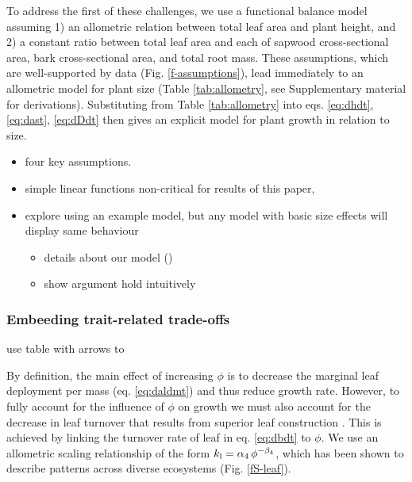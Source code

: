 \documentclass[12pt, a4paper]{article}
\begin{document}
To address the first of these challenges, we use a functional balance
model \citep{yokozawa-1995,falster-2011} assuming
1) an allometric relation between total leaf area and plant height, and
2) a constant ratio between total leaf area and each of sapwood
cross-sectional area, bark cross-sectional area, and total root mass.
These assumptions, which are well-supported by data (Fig.
\ref{f-assumptions}), lead immediately to an allometric model for plant
size (Table \ref{tab:allometry}, see Supplementary material for
derivations). Substituting from Table \ref{tab:allometry} into eqs.
\ref{eq:dhdt}, \ref{eq:dast}, \ref{eq:dDdt} then gives an explicit model
for plant growth in relation to size.


\begin{itemize}
\itemsep1pt\parskip0pt
\item
  four key assumptions.
\item
  simple linear functions non-critical for results of this paper,
\item
  explore using an example model, but any model with basic size effects
  will display same behaviour

  \begin{itemize}
  \itemsep1pt\parskip0pt
  \item
    details about our model ()
  \item
    show argument hold intuitively
  \end{itemize}
\end{itemize}

\subsubsection{Embeeding trait-related trade-offs}

use table with arrows to



By definition, the main effect of increasing $\phi$ is to decrease the
marginal leaf deployment per mass (eq. \ref{eq:daldmt}) and thus reduce
growth rate. However, to fully account for the influence of $\phi$ on
growth we must also account for the decrease in leaf turnover that
results from superior leaf construction \citep{wright-2004}.
This is achieved by linking the turnover rate of leaf in eq.
\ref{eq:dbdt} to $\phi$. We use an allometric scaling relationship of
the form $k_{\rm l}=\alpha_4 \, \phi^{-\beta_4}$, which has been
shown to describe patterns across diverse
ecosystems \citep{wright-2004} (Fig. \ref{fS-leaf}).
\end{document}
